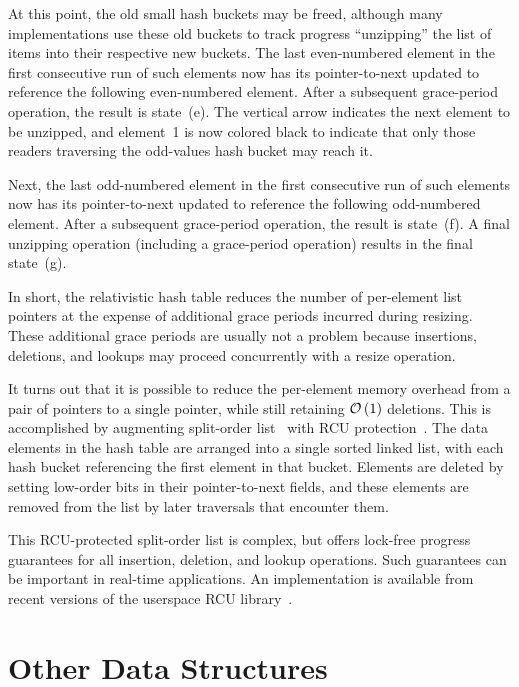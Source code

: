 At this point, the old small hash buckets may be freed, although many
implementations use these old buckets to track progress ``unzipping''
the list of items into their respective new buckets.
The last even-numbered element in the first consecutive run of such
elements now has its pointer-to-next updated to reference the following
even-numbered element.
After a subsequent grace-period operation, the result is state~(e).
The vertical arrow indicates the next element to be unzipped, and
element~1 is now colored black to indicate that only those readers traversing
the odd-values hash bucket may reach it.

Next, the last odd-numbered element in the first consecutive run of such
elements now has its pointer-to-next updated to reference the following
odd-numbered element.
After a subsequent grace-period operation, the result is state~(f).
A final unzipping operation (including a grace-period operation)
results in the final state~(g).

In short, the relativistic hash table reduces the number of per-element
list pointers at the expense of additional grace periods incurred during
resizing.
These additional grace periods are usually not a problem because
insertions, deletions, and lookups may proceed concurrently with
a resize operation.

It turns out that it is possible to reduce the per-element memory overhead
from a pair of pointers to a single pointer, while still retaining
$\mathcal{O}\left(1\right)$ deletions.
This is accomplished by augmenting split-order
list~\cite{OriShalev2006SplitOrderListHash}
with RCU
protection~\cite{MathieuDesnoyers2009URCU,PaulMcKenney2013LWNURCUhash}.
The data elements in the hash table are arranged into a single
sorted linked list, with each hash bucket referencing the first element
in that bucket.
Elements are deleted by setting low-order bits in their pointer-to-next
fields, and these elements are removed from the list by later traversals
that encounter them.

This RCU-protected split-order list is complex, but offers lock-free
progress guarantees for all insertion, deletion, and lookup operations.
Such guarantees can be important in real-time applications.
An implementation is available from recent versions of the userspace RCU
library~\cite{MathieuDesnoyers2009URCU}.

\section{Other Data Structures}
\label{sec:datastruct:Other Data Structures}

